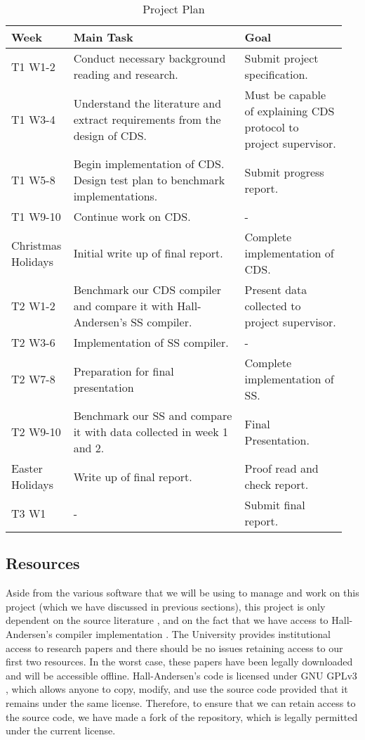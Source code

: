 \begin{table}[H]
\centering
\caption{Project Plan}
\begin{tabular}{p{0.15\linewidth}p{0.5\linewidth}p{0.3\linewidth}}
\toprule
\bf Week & \bf Main Task & \bf Goal \\ 
\midrule
T1 W1-2
& Conduct necessary background reading and research.
& Submit project specification. \\\addlinespace[\rowheight]
T1 W3-4
& Understand the literature and extract requirements from the design of CDS.
& Must be capable of explaining CDS protocol to project supervisor. \\\addlinespace[\rowheight]
T1 W5-8
& Begin implementation of CDS. Design test plan to benchmark implementations.
& Submit progress report. \\\addlinespace[\rowheight]
T1 W9-10
& Continue work on CDS.
& - \\\addlinespace[\rowheight]
Christmas Holidays
& Initial write up of final report.
& Complete implementation of CDS. \\\addlinespace[\rowheight]
T2 W1-2
& Benchmark our CDS compiler and compare it with Hall-Andersen's SS compiler.
& Present data collected to project supervisor. \\\addlinespace[\rowheight]
T2 W3-6
& Implementation of SS compiler.
& - \\\addlinespace[\rowheight]
T2 W7-8
& Preparation for final presentation
& Complete implementation of SS. \\\addlinespace[\rowheight]
T2 W9-10
& Benchmark our SS and compare it with data collected in week 1 and 2.
& Final Presentation. \\\addlinespace[\rowheight]
Easter Holidays
& Write up of final report. 
& Proof read and check report. \\\addlinespace[\rowheight]
T3 W1
& -
& Submit final report. \\
\bottomrule
\end{tabular}
\label{table:timetable}
\end{table}

\subsection{Resources}

Aside from the various software that we will be using to manage and work on this project (which we have discussed in previous sections), this project is only dependent on the source literature \cite{CDS94, StackingSigmas}, and on the fact that we have access to Hall-Andersen's compiler implementation \cite{MHAStackSig}. The University provides institutional access to research papers and there should be no issues retaining access to our first two resources. In the worst case, these papers have been legally downloaded and will be accessible offline. Hall-Andersen's code is licensed under GNU GPLv3 \cite{GPLv3}, which allows anyone to copy, modify, and use the source code provided that it remains under the same license. Therefore, to ensure that we can retain access to the source code, we have made a fork of the repository, which is legally permitted under the current license. 

